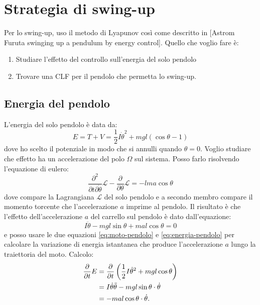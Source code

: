 \section{Strategia di swing-up}
Per lo swing-up, uso il metodo di Lyapunov così come descritto in [Astrom Furuta swinging up a pendulum by energy control].
Quello che voglio fare è:

\begin{enumerate}
    \item Studiare l'effetto del controllo sull'energia del solo pendolo
    \item Trovare una CLF per il pendolo che permetta lo swing-up.
\end{enumerate}

\subsection{Energia del pendolo}
\label{subsec:energia-pendolo}
L'energia del solo pendolo è data da:
\begin{equation}
    E = T + V = \frac 1 2 I \dot \theta^2 + mgl(\cos\theta-1)
    \label{eq:energia-pendolo}
\end{equation}
dove ho scelto il potenziale in modo che si annulli quando $\theta=0$. Voglio studiare che effetto ha un accelerazione del polo $\Omega$ sul sistema. Posso farlo risolvendo l'equazione di eulero:
\begin{equation*}
    \frac {\partial^2} {\partial t \partial \dot \theta} \mathcal L - \frac \partial {\partial \theta} \mathcal L = -l ma \cos \theta
\end{equation*}
dove compare la Lagrangiana $\mathcal L$ del solo pendolo e a secondo membro compare il momento torcente che l'accelerazione $a$ imprime al pendolo. Il risultato è che l'effetto dell'accelerazione $a$ del carrello sul pendolo è dato dall'equazione:
\begin{equation}
    I \ddot \theta - mgl\sin \theta + mal \cos \theta = 0
    \label{eq:moto-pendolo}
\end{equation}
e posso usare le due equazioni \eqref{eq:moto-pendolo} e \eqref{eq:energia-pendolo} per calcolare la variazione di energia istantanea che produce l'accelerazione $a$ lungo la traiettoria del moto. Calcolo:
\begin{equation}
    \begin{aligned}
        \frac \partial {\partial t} E
        &= \frac \partial {\partial t} \left(\frac 1 2 I \dot \theta ^2 + mgl \cos \theta  \right) \\
        &= I \dot \theta \ddot \theta - mgl \sin \theta \cdot \dot \theta \\
        &= -mal \cos \theta \cdot \dot \theta
        .
        \label{eq:effetto-energia}
    \end{aligned}
\end{equation}
